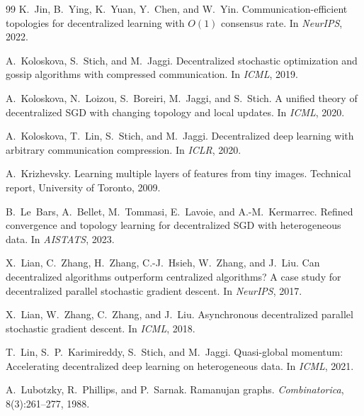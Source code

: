 \documentclass{article}
\begin{document}
\begin{thebibliography}{99}
K.~Jin, B.~Ying, K.~Yuan, Y.~Chen, and W.~Yin.
\newblock Communication-efficient topologies for decentralized learning with {$O(1)$} consensus rate.
\newblock In \emph{NeurIPS}, 2022.

A.~Koloskova, S.~Stich, and M.~Jaggi.
\newblock Decentralized stochastic optimization and gossip algorithms with compressed communication.
\newblock In \emph{ICML}, 2019.

A.~Koloskova, N.~Loizou, S.~Boreiri, M.~Jaggi, and S.~Stich.
\newblock A unified theory of decentralized {SGD} with changing topology and local updates.
\newblock In \emph{ICML}, 2020.

A.~Koloskova, T.~Lin, S.~Stich, and M.~Jaggi.
\newblock Decentralized deep learning with arbitrary communication compression.
\newblock In \emph{ICLR}, 2020.

A.~Krizhevsky.
\newblock Learning multiple layers of features from tiny images.
\newblock Technical report, University of Toronto, 2009.

B.~Le~Bars, A.~Bellet, M.~Tommasi, E.~Lavoie, and A.-M.~Kermarrec.
\newblock Refined convergence and topology learning for decentralized {SGD} with heterogeneous data.
\newblock In \emph{AISTATS}, 2023.

X.~Lian, C.~Zhang, H.~Zhang, C.-J.~Hsieh, W.~Zhang, and J.~Liu.
\newblock Can decentralized algorithms outperform centralized algorithms? {A} case study for decentralized parallel stochastic gradient descent.
\newblock In \emph{NeurIPS}, 2017.

X.~Lian, W.~Zhang, C.~Zhang, and J.~Liu.
\newblock Asynchronous decentralized parallel stochastic gradient descent.
\newblock In \emph{ICML}, 2018.

T.~Lin, S.~P.~Karimireddy, S.~Stich, and M.~Jaggi.
\newblock Quasi-global momentum: Accelerating decentralized deep learning on heterogeneous data.
\newblock In \emph{ICML}, 2021.

A.~Lubotzky, R.~Phillips, and P.~Sarnak.
\newblock Ramanujan graphs.
\newblock \emph{Combinatorica}, 8(3):261--277, 1988.


\end{thebibliography}
\end{document}
